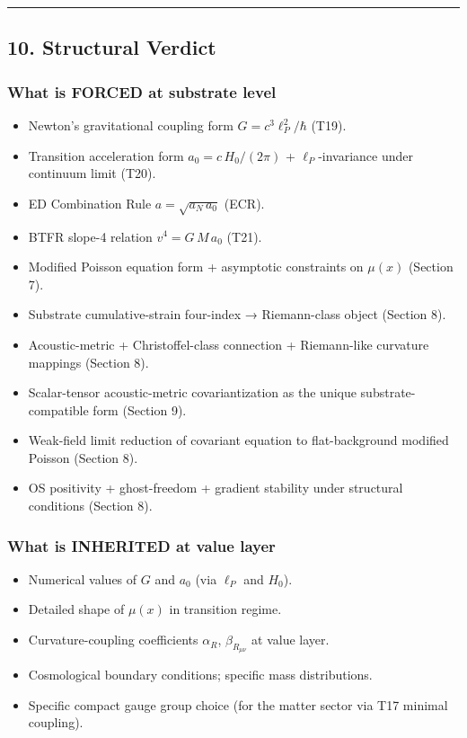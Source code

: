 \documentclass[
]{article}
\providecommand{\tightlist}{%
  \setlength{\itemsep}{0pt}\setlength{\parskip}{0pt}}
\begin{document}
\begin{center}\rule{0.5\linewidth}{0.5pt}\end{center}

\subsection{10. Structural Verdict}\label{structural-verdict}

\subsubsection{What is FORCED at substrate
level}\label{what-is-forced-at-substrate-level}

\begin{itemize}
\tightlist
\item
  Newton's gravitational coupling form \(G = c^3\ell_P^2/\hbar\) (T19).
\item
  Transition acceleration form \(a_0 = c\,H_0/(2\pi)\) +
  \(\ell_P\)-invariance under continuum limit (T20).
\item
  ED Combination Rule \(a = \sqrt{a_N\,a_0}\) (ECR).
\item
  BTFR slope-4 relation \(v^4 = G\,M\,a_0\) (T21).
\item
  Modified Poisson equation form + asymptotic constraints on \(\mu(x)\)
  (Section 7).
\item
  Substrate cumulative-strain four-index → Riemann-class object (Section
  8).
\item
  Acoustic-metric + Christoffel-class connection + Riemann-like
  curvature mappings (Section 8).
\item
  Scalar-tensor acoustic-metric covariantization as the unique
  substrate-compatible form (Section 9).
\item
  Weak-field limit reduction of covariant equation to flat-background
  modified Poisson (Section 8).
\item
  OS positivity + ghost-freedom + gradient stability under structural
  conditions (Section 8).
\end{itemize}

\subsubsection{What is INHERITED at value
layer}\label{what-is-inherited-at-value-layer}

\begin{itemize}
\tightlist
\item
  Numerical values of \(G\) and \(a_0\) (via \(\ell_P\) and \(H_0\)).
\item
  Detailed shape of \(\mu(x)\) in transition regime.
\item
  Curvature-coupling coefficients \(\alpha_R\), \(\beta_{R_{\mu\nu}}\)
  at value layer.
\item
  Cosmological boundary conditions; specific mass distributions.
\item
  Specific compact gauge group choice (for the matter sector via T17
  minimal coupling).
\end{itemize}
\end{document}
